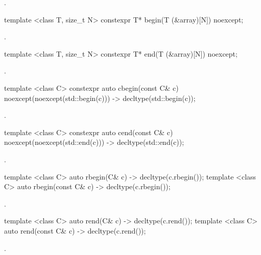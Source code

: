 \begin{itemdescr}
\pnum
\returns {}.
\end{itemdescr}

%
\begin{itemdecl}
template <class T, size_t N> constexpr T* begin(T (&array)[N]) noexcept;
\end{itemdecl}

\begin{itemdescr}
\pnum
\returns {}.
\end{itemdescr}

%
\begin{itemdecl}
template <class T, size_t N> constexpr T* end(T (&array)[N]) noexcept;
\end{itemdecl}

\begin{itemdescr}
\pnum
\returns {}.
\end{itemdescr}

%
\begin{itemdecl}
template <class C> constexpr auto cbegin(const C& c) noexcept(noexcept(std::begin(c)))
  -> decltype(std::begin(c));
\end{itemdecl}
\begin{itemdescr}
\pnum \returns {}.
\end{itemdescr}

%
\begin{itemdecl}
template <class C> constexpr auto cend(const C& c) noexcept(noexcept(std::end(c)))
  -> decltype(std::end(c));
\end{itemdecl}
\begin{itemdescr}
\pnum \returns {}.
\end{itemdescr}

%
\begin{itemdecl}
template <class C> auto rbegin(C& c) -> decltype(c.rbegin());
template <class C> auto rbegin(const C& c) -> decltype(c.rbegin());
\end{itemdecl}
\begin{itemdescr}
\pnum \returns {}.
\end{itemdescr}

%
\begin{itemdecl}
template <class C> auto rend(C& c) -> decltype(c.rend());
template <class C> auto rend(const C& c) -> decltype(c.rend());
\end{itemdecl}
\begin{itemdescr}
\pnum \returns {}.
\end{itemdescr}

